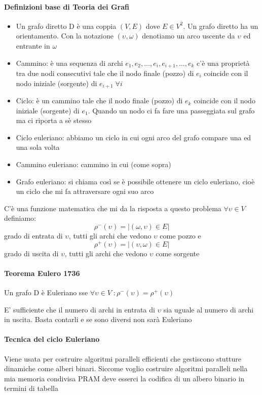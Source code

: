 \paragraph{Definizioni base di Teoria dei Grafi}
\begin{itemize}
    \item Un grafo diretto D è una coppia $(V,E)$ dove $E \in V^2$. Un grafo diretto ha un orientamento. Con la notazione $(\upsilon, \omega)$ denotiamo un arco uscente da $\upsilon$ ed entrante in $\omega$
    \item Cammino: è una sequenza di archi $e_1, e_2, \dots , e_i, e_{i+1}, \dots , e_k$ c'è una proprietà tra due nodi consecutivi tale che il nodo finale (pozzo) di $e_i$ coincide con il nodo iniziale (sorgente) di $e_{i+1} \; \forall i$ 
    \item Ciclo: è un cammino tale che il nodo finale (pozzo) di $e_k$ coincide con il nodo iniziale (sorgente) di $e_1$. Quando un nodo ci fa fare una passeggiata sul grafo ma ci riporta a sè stesso
    \item Ciclo euleriano: abbiamo un ciclo in cui ogni arco del grafo compare una ed una sola volta
    \item Cammino euleriano: cammino in cui (come sopra)
    \item Grafo euleriano: si chiama così se è possibile ottenere un ciclo euleriano, cioè un ciclo che mi fa attraversare ogni suo arco
\end{itemize}

C'è una funzione matematica che mi da la risposta a questo problema $\forall \upsilon \in V$ definiamo: 
$$\rho^-(\upsilon) = | {(\omega, \upsilon) \in E} |$$
grado di entrata di $\upsilon$, tutti gli archi che vedono $\upsilon$ come pozzo e
$$\rho^+(\upsilon) = | {(\upsilon, \omega) \in E} |$$
grado di uscita di $\upsilon$, tutti gli archi che vedono $\upsilon$ come sorgente 

\paragraph{Teorema Eulero 1736}
Un grafo D è Euleriano sse $\forall \upsilon \in V\; : \rho^-(\upsilon) = \rho^+(\upsilon)$

E' sufficiente che il numero di archi in entrata di $\upsilon$ sia uguale al numero di archi in uscita. Basta contarli e se sono diversi non sarà Euleriano

\paragraph{Tecnica del ciclo Euleriano}
Viene usata per costruire algoritmi paralleli efficienti che gestiscono stutture dinamiche come alberi binari. Siccome voglio costruire algoritmi paralleli nella mia memoria condivisa PRAM deve esserci la codifica di un albero binario in termini di tabella

